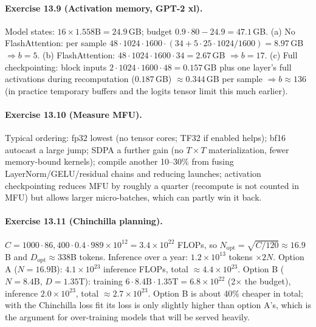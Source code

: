 \paragraph{Exercise 13.9 (Activation memory, GPT-2 xl).}
Model states: $16\times1.558\text{B}=24.9$\,GB; budget $0.9\cdot80-24.9=47.1$\,GB.
(a) No FlashAttention: per sample $48\cdot1024\cdot1600\cdot(34+5\cdot25\cdot1024/1600)=8.97$\,GB
$\Rightarrow b=5$. (b) FlashAttention: $48\cdot1024\cdot1600\cdot34=2.67$\,GB $\Rightarrow b=17$.
(c) Full checkpointing: block inputs $2\cdot1024\cdot1600\cdot48=0.157$\,GB plus one layer's full
activations during recomputation ($0.187$\,GB) $\approx0.344$\,GB per sample $\Rightarrow b\approx136$
(in practice temporary buffers and the logits tensor limit this much earlier).

\paragraph{Exercise 13.10 (Measure MFU).}
Typical ordering: fp32 lowest (no tensor cores; TF32 if enabled helps); bf16 autocast a large
jump; SDPA a further gain (no $T\times T$ materialization, fewer memory-bound kernels); compile
another 10--30\% from fusing LayerNorm/GELU/residual chains and reducing launches; activation
checkpointing reduces MFU by roughly a quarter (recompute is not counted in MFU) but allows larger
micro-batches, which can partly win it back.

\paragraph{Exercise 13.11 (Chinchilla planning).}
$C=1000\cdot86{,}400\cdot0.4\cdot989\times10^{12}=3.4\times10^{22}$ FLOPs, so
$N_{\text{opt}}=\sqrt{C/120}\approx16.9$B and $D_{\text{opt}}\approx338$B tokens.
Inference over a year: $1.2\times10^{13}$ tokens $\times2N$. Option A ($N=16.9$B):
$4.1\times10^{23}$ inference FLOPs, total $\approx4.4\times10^{23}$. Option B ($N=8.4$B,
$D=1.35$T): training $6\cdot8.4\text{B}\cdot1.35\text{T}=6.8\times10^{22}$ (2$\times$ the budget),
inference $2.0\times10^{23}$, total $\approx2.7\times10^{23}$. Option B is about 40\% cheaper in total;
with the Chinchilla loss fit its loss is only slightly higher than option A's, which is the
argument for over-training models that will be served heavily.

